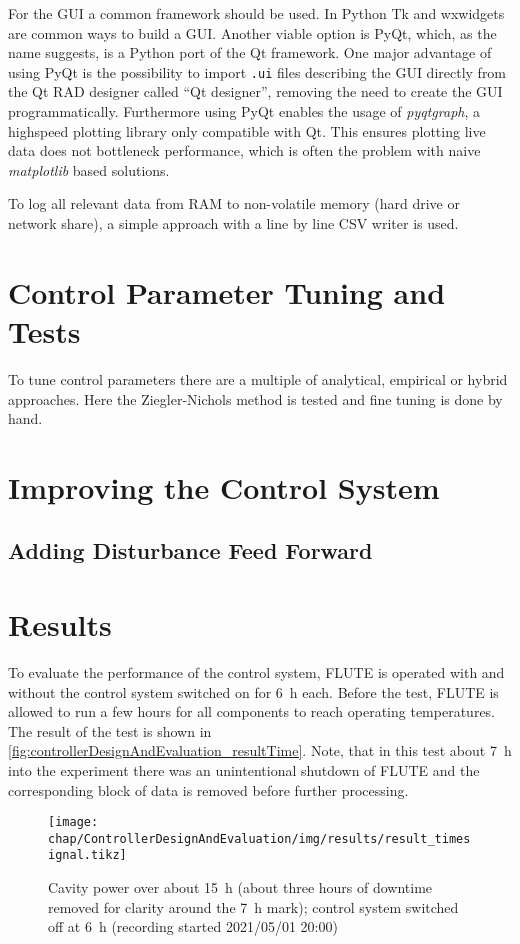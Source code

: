 For the GUI a common framework should be used. In Python Tk and wxwidgets are common ways to build a GUI. Another viable option is PyQt, which, as the name suggests, is a Python port of the Qt framework. One major advantage of using PyQt is the possibility to import \texttt{.ui} files describing the GUI directly from the Qt RAD designer called ``Qt designer'', removing the need to create the GUI programmatically. Furthermore using PyQt enables the usage of \textit{pyqtgraph}, a highspeed plotting library only compatible with Qt. This ensures plotting live data does not bottleneck performance, which is often the problem with naive \textit{matplotlib} based solutions.

To log all relevant data from RAM to non-volatile memory (hard drive or network share), a simple approach with a line by line CSV writer is used.


\section{Control Parameter Tuning and Tests}
To tune control parameters there are a multiple of analytical, empirical or hybrid approaches. Here the Ziegler-Nichols method is tested and fine tuning is done by hand.

\section{Improving the Control System}

\subsection{Adding Disturbance Feed Forward}


\newpage
\section{Results}
To evaluate the performance of the control system, FLUTE is operated with and without the control system switched on for \SI{6}{\hour} each.
Before the test, FLUTE is allowed to run a few hours for all components to reach operating temperatures.
The result of the test is shown in \autoref{fig:controllerDesignAndEvaluation_resultTime}.
Note, that in this test about \SI{7}{\hour} into the experiment there was an unintentional shutdown of FLUTE and the corresponding block of data is removed before further processing.

\begin{figure}[tbh]
	\centering
	\texttt{[image: chap/ControllerDesignAndEvaluation/img/results/result\_timesignal.tikz]}
	\caption{Cavity power over about \SI{15}{\hour} (about three hours of downtime removed for clarity around the \SI{7}{\hour} mark); control system switched off at \SI{6}{\hour} (recording started 2021/05/01 20:00)}
	\label{fig:controllerDesignAndEvaluation_resultTime}
\end{figure}

